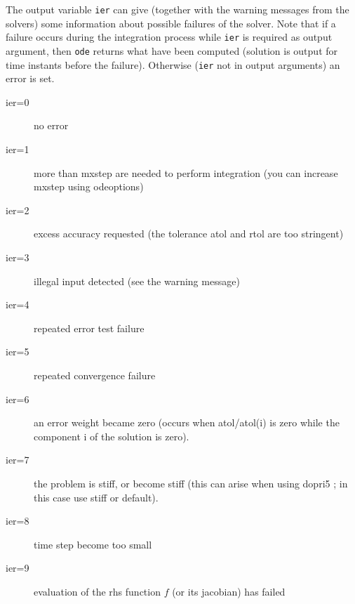 \begin{mandescription}
The output variable {\tt ier} can give (together with the warning messages from
the solvers) some information about possible failures of the solver. Note that
if a failure occurs during the integration process while {\tt ier} is required
as output argument, then {\tt ode} returns what have been computed (solution
is output for time instants before the failure). Otherwise ({\tt ier} not in
output arguments) an error is set. 
\begin{description}
\item[ier=0] no error
\item[ier=1] more than mxstep are needed to perform integration (you can increase
             mxstep using odeoptions)
\item[ier=2] excess accuracy requested (the tolerance atol and rtol are too stringent)
\item[ier=3] illegal input detected (see the warning message)
\item[ier=4] repeated error test failure
\item[ier=5] repeated convergence failure
\item[ier=6] an error weight became zero (occurs when atol/atol(i) is zero while
             the component i of the solution is zero).
\item[ier=7] the problem is stiff, or become stiff (this can arise when using dopri5 ;
             in this case use stiff or default).
\item[ier=8] time step become too small
\item[ier=9] evaluation of the rhs function $f$ (or its jacobian) has failed
\end{description}


  

\end{mandescription} 

